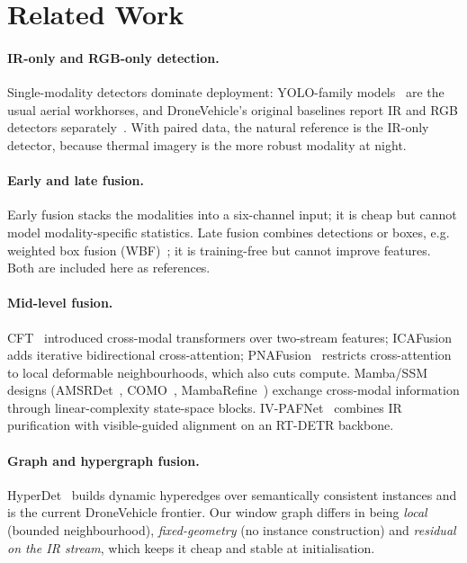 \documentclass[10pt,twocolumn,letterpaper]{article}
\begin{document}
\section{Related Work}
\paragraph{IR-only and RGB-only detection.}
Single-modality detectors dominate deployment: YOLO-family models~\cite{yolo12}
are the usual aerial workhorses, and DroneVehicle's original baselines
report IR and RGB detectors separately~\cite{dronevehicle}. With paired data,
the natural reference is the IR-only detector, because thermal imagery is the
more robust modality at night.

\paragraph{Early and late fusion.}
Early fusion stacks the modalities into a six-channel input; it is cheap but
cannot model modality-specific statistics. Late fusion combines detections or
boxes, e.g. weighted box fusion (WBF)~\cite{wbf}; it is training-free but
cannot improve features. Both are included here as references.

\paragraph{Mid-level fusion.}
CFT~\cite{cft} introduced cross-modal transformers over two-stream features;
ICAFusion~\cite{icafusion} adds iterative bidirectional cross-attention;
PNAFusion~\cite{pnafusion} restricts cross-attention to local deformable
neighbourhoods, which also cuts compute. Mamba/SSM designs
(AMSRDet~\cite{amsrdet}, COMO~\cite{como}, MambaRefine~\cite{mambarefine})
exchange cross-modal information through linear-complexity state-space blocks.
IV-PAFNet~\cite{ivpafnet} combines IR purification with visible-guided
alignment on an RT-DETR backbone.

\paragraph{Graph and hypergraph fusion.}
HyperDet~\cite{hyperdet} builds dynamic hyperedges over semantically consistent
instances and is the current DroneVehicle frontier. Our window graph differs
in being \emph{local} (bounded neighbourhood), \emph{fixed-geometry} (no
instance construction) and \emph{residual on the IR stream}, which keeps it
cheap and stable at initialisation.
\end{document}
